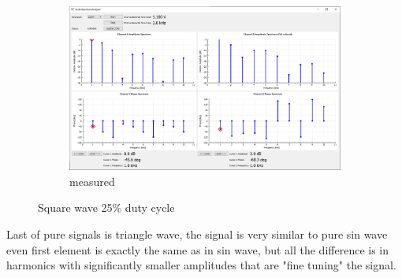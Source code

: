 \documentclass[notitlepage, a4paper, 11pt]{article}
\begin{document}
\begin{figure}[H]
\begin{subfigure}[][][t]{0.3\textwidth}
			\includegraphics[width=\textwidth, trim=10 80 555 100, clip]{../img/Circuit1/dut25}
			\caption{measured}
			\label{fig:meas-signal-c}
		\end{subfigure}
		\caption{Square wave 25\% duty cycle}
		\label{fig:pure-sin}
	\end{figure}
	
	Last of pure signals is triangle wave, the signal is very similar to pure sin wave even first element is exactly the same as in sin wave, but all the difference is in harmonics with significantly smaller amplitudes that are "fine tuning" the signal.
	
\end{document}
